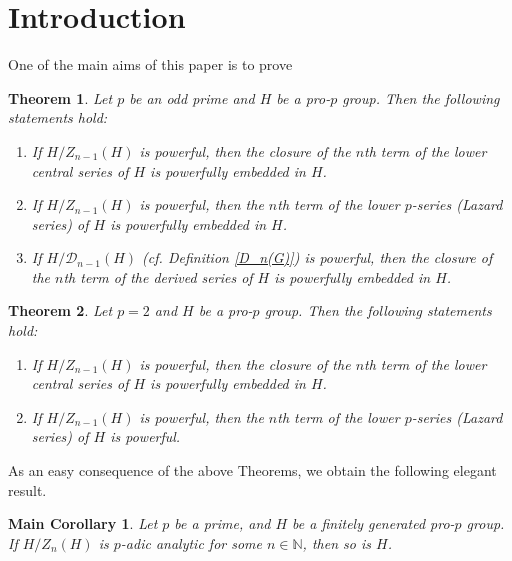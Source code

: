 \documentclass[12pt]{elsarticle}
\makeatletter
\newtheorem{theorem}{Theorem}[section]
\newtheorem*{main corollary*}{Main Corollary}
\theoremstyle{definition}
\newcommand{\settheoremtag}[1]{%
  \let\oldthetheorem\thetheorem%
  \renewcommand{\thetheorem}{#1}%
  \g@addto@macro\endtheorem{%
    \global\let\thetheorem\oldthetheorem}%
  }
\makeatother
\begin{document}
 \section{Introduction}
 One of the main aims of this paper is to prove

\settheoremtag{A}
\begin{theorem} \label{MR: H/Z,H/D powerful gamma_n,P_n,Gamma_n powerful}
Let $p$ be an odd prime and $H$ be a pro-$p$ group. Then the following statements hold:
\begin{enumerate}
\item[(i)]  If $H/Z_{n-1}(H)$ is powerful, then the closure of the $n$th term of the lower central series of $H$ is powerfully embedded in $H$.
\item[(ii)]  If $H/Z_{n-1}(H)$ is powerful, then the $n$th term of the lower $p$-series (Lazard series) of $H$ is powerfully embedded in $H$.
\item [(iii)] If $H/\mathcal{D}_{n-1}(H)$ (cf. Definition \ref{D_n(G)}) is powerful, then the closure of the $n$th term of the derived series of $H$ is powerfully embedded in $H$.
\end{enumerate}
\end{theorem}


\settheoremtag{A$'$}
\begin{theorem} \label{MR: foreven H/Z,H/D powerful gamma_n,P_n,Gamma_n powerful}
Let $p=2$ and $H$ be a pro-$p$ group. Then the following statements hold:
\begin{enumerate}
\item[(i)]  If $H/Z_{n-1}(H)$ is powerful, then the closure of the $n$th term of the lower central series of $H$ is powerfully embedded in $H$. 
\item[(ii)]  If $H/Z_{n-1}(H)$ is powerful, then the $n$th term of the lower $p$-series (Lazard series) of $H$ is powerful.
\end{enumerate}
\end{theorem}

As an easy consequence of the above Theorems, we obtain the following elegant result.

\begin{main corollary*} \label{MR: p-adic analytic corollary}
Let $p$ be a prime, and $H$ be a finitely generated pro-$p$ group. If $H/Z_n(H)$ is $p$-adic analytic for some $n\in \mathbb{N}$, then so is $H$.
\end{main corollary*}

\end{document}
